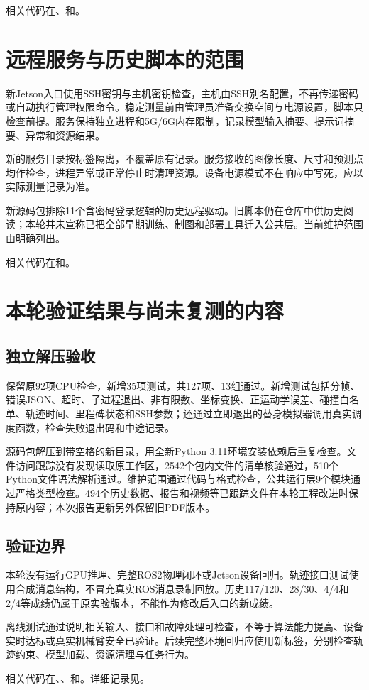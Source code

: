 相关代码在、和。

\section{远程服务与历史脚本的范围}
新Jetson入口使用SSH密钥与主机密钥检查，主机由SSH别名配置，不再传递密码或自动执行管理权限命令。稳定测量前由管理员准备交换空间与电源设置，脚本只检查前提。服务保持独立进程和5G/6G内存限制，记录模型输入摘要、提示词摘要、异常和资源结果。

新的服务目录按标签隔离，不覆盖原有记录。服务接收的图像长度、尺寸和预测点均作检查，进程异常或正常停止时清理资源。设备电源模式不在响应中写死，应以实际测量记录为准。

新源码包排除11个含密码登录逻辑的历史远程驱动。旧脚本仍在仓库中供历史阅读；本轮并未宣称已把全部早期训练、制图和部署工具迁入公共层。当前维护范围由明确列出。

相关代码在和。

\section{本轮验证结果与尚未复测的内容}
\subsection{独立解压验收}
保留原92项CPU检查，新增35项测试，共127项、13组通过。新增测试包括分帧、错误JSON、超时、子进程退出、非有限数、坐标变换、正运动学误差、碰撞白名单、轨迹时间、里程碑状态和SSH参数；还通过立即退出的替身模拟器调用真实调度函数，检查失败退出码和中途记录。

源码包解压到带空格的新目录，用全新Python 3.11环境安装依赖后重复检查。文件访问跟踪没有发现读取原工作区，2542个包内文件的清单核验通过，510个Python文件语法解析通过。维护范围通过代码与格式检查，公共运行层9个模块通过严格类型检查。494个历史数据、报告和视频等已跟踪文件在本轮工程改进时保持原内容；本次报告更新另外保留旧PDF版本。

\subsection{验证边界}
本轮没有运行GPU推理、完整ROS2物理闭环或Jetson设备回归。轨迹接口测试使用合成消息结构，不冒充真实ROS消息录制回放。历史117/120、28/30、4/4和2/4等成绩仍属于原实验版本，不能作为修改后入口的新成绩。

离线测试通过说明相关输入、接口和故障处理可检查，不等于算法能力提高、设备实时达标或真实机械臂安全已验证。后续完整环境回归应使用新标签，分别检查轨迹约束、模型加载、资源清理与任务行为。

相关代码在、、和。详细记录见。
